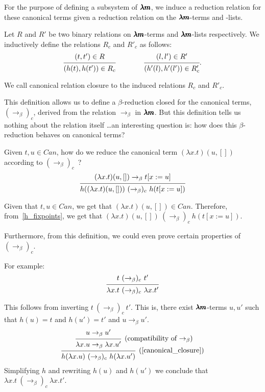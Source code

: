 For the purpose of defining a subsystem of $\pmb{\lambda m}$, we induce a reduction relation for these canonical terms given a reduction relation on the $\pmb{\lambda m}$-terms and -lists.

\begin{definition}%
  \label{canonical_closure}
  Let $R$ and $R'$ be two binary relations on $\pmb{\lambda m}$-terms and $\pmb{\lambda m}$-lists respectively.
  We inductively define the relations $R_c$ and $R'_c$ as follows:
  \[
    \begin{prooftree}
      \hypo{ (t, t') \in R }
      \infer1{ (h(t), h(t')) \in R_c } 
    \end{prooftree}
    \qquad \qquad
    \begin{prooftree}
      \hypo{ (l, l') \in R' }
      \infer1{ (h'(l), h'(l')) \in R'_c } 
    \end{prooftree}.
  \]

  We call canonical relation closure to the induced relations $R_c$ and $R'_c$.
\end{definition}

This definition allows us to define a $\beta$-reduction closed for the canonical terms, ${(\to_\beta)}_c$, derived from the relation $\to_\beta$ in $\pmb{\lambda m}$.
But this definition tells us nothing about the relation itself \dots an interesting question is: how does this $\beta$-reduction behaves on canonical terms?

Given $t, u \in Can$, how do we reduce the canonical term $(\lambda x . t)(u, [])$ according to $(\to_\beta)_c$~?
\[ \begin{prooftree}
    \hypo{ (\lambda x.t)(u, []) \to_\beta t[x := u] }
    \infer1[]{ h((\lambda x.t)(u, [])) \ (\to_\beta)_c \ h(t[x := u]) }
  \end{prooftree} \]

Given that $t, u \in Can$, we get that $(\lambda x.t)(u, []) \in Can$.
Therefore, from~\cref{h_fixpoints}, we get that $(\lambda x.t)(u, []) \ (\to_\beta)_c \ h(t[x := u])$.

Furthermore, from this definition, we could even prove certain properties of $(\to_\beta)_c$.

For example:
\[ \begin{prooftree}
    \hypo{ t \ (\to_\beta)_c \ t' }
    \infer1{ \lambda x.t \ (\to_\beta)_c \ \lambda x.t' }.
  \end{prooftree} \]

This follows from inverting $t \ (\to_\beta)_c \ t'$.
This is, there exist $\pmb{\lambda m}$-terms $u, u'$ such that $h(u) = t$ and $h(u') = t'$ and $u \to_\beta u'$.
\[ \begin{prooftree}
    \hypo{ u \to_\beta u' }
    \infer1[\text{(compatibility of $\to_\beta$)}]{ \lambda x.u \to_\beta \lambda x.u' }
    \infer1[\text{(\cref{canonical_closure})}]{ h(\lambda x.u) \ (\to_\beta)_c \ h(\lambda x.u') }
  \end{prooftree} \]
Simplifying $h$ and rewriting $h(u)$ and $h(u')$ we conclude that $\lambda x.t \ (\to_\beta)_c \ \lambda x.t'$.

